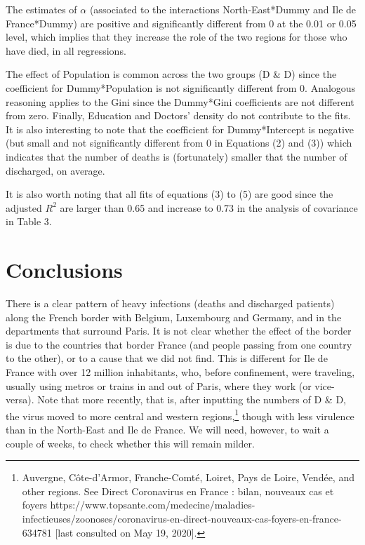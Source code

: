 \documentclass[a4paper]{article}
\theoremstyle{plain}
\theoremstyle{definition}
\begin{document}
The estimates of $\alpha$ (associated to the interactions North-East*Dummy and Ile de France*Dummy) are positive and significantly different from  0 at the 0.01 or 0.05 level, which implies that they increase the role of the two regions for those who have died, in all regressions. 

The effect of Population is common across the two groups (D \& D) since the coefficient for Dummy*Population is not significantly different from 0. Analogous reasoning applies to the Gini since the Dummy*Gini coefficients are not different from zero. Finally, Education and Doctors' density  do not contribute to the fits. It is also interesting to note that the coefficient for Dummy*Intercept is negative (but small and not significantly different from 0 in Equations (2) and (3)) which indicates that the number of deaths is (fortunately) smaller that the number of discharged, on average. 

It is also worth noting that all fits of equations (3) to (5) are good since the adjusted $R^2$ are larger than 0.65 and increase to 0.73 in the analysis of covariance in Table 3.



 

\section {Conclusions}  

There is a clear pattern of heavy infections (deaths and discharged patients) along the French border with Belgium, Luxembourg and Germany, and in the departments that surround  Paris. It is not clear whether the effect of the border is due to the countries that border France (and people passing from one country to the other), or to a cause that we did not find. This is different for Ile de France with over 12 million inhabitants, who, before confinement, were traveling, usually using metros or trains in and out of Paris, where they work (or vice-versa). Note that more recently, that is, after inputting the numbers of D \& D, the virus moved to more central and western regions,\footnote{Auvergne, C\^ote-d'Armor, Franche-Comt\'e, Loiret, Pays de Loire, Vend\'ee,  and other regions. See Direct Coronavirus en France : bilan, nouveaux cas et foyers https://www.topsante.com/medecine/maladies-infectieuses/zoonoses/coronavirus-en-direct-nouveaux-cas-foyers-en-france-634781 [last consulted on May 19, 2020].} though with less virulence than in the North-East and Ile de France. We will need, however, to wait a couple of weeks, to check whether this will remain milder.
\end{document}
